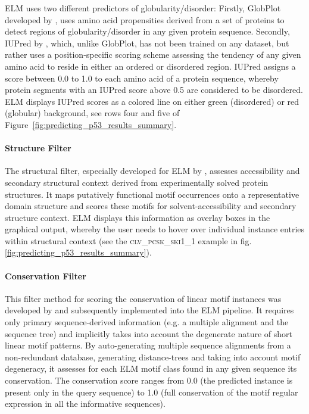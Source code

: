 \documentclass[12pt]{article}
\newcommand\motif[1]{%
    \textsc{\lowercase{#1}}%
}
\begin{document}
ELM uses two different predictors of globularity/disorder: Firstly, GlobPlot
developed by \cite{12824398}, uses amino acid propensities derived from a set of
proteins to detect regions of globularity/disorder in any given protein
sequence. Secondly, IUPred by \cite{15955779}, which, unlike GlobPlot, has not
been trained on any dataset, but rather uses a position-specific scoring scheme
assessing the tendency of any given amino acid to reside in either an ordered
or disordered region. IUPred assigns a score between 0.0 to 1.0 to each amino
acid of a protein sequence, whereby protein segments with an IUPred score above
0.5 are considered to be disordered. ELM displays IUPred scores as a colored
line on either green (disordered) or red (globular) background, see rows four
and five of Figure~\ref{fig:predicting_p53_results_summary}.

\paragraph*{Structure Filter}\label{StructureFilter}

The structural filter, especially developed for ELM by \cite{19852836},
assesses accessibility and secondary structural context derived from
experimentally solved protein structures. It maps putatively functional motif
occurrences onto a representative domain structure and scores these motifs for
solvent-accessibility and secondary structure context. ELM displays this
information as overlay boxes in the graphical output, whereby the user needs to
hover over individual instance entries within structural context (see the
\motif{CLV\_PCSK\_SKI1\_1} example in fig.
\ref{fig:predicting_p53_results_summary}).

\paragraph*{Conservation Filter}\label{ConservationFilter}

This filter method for scoring the conservation of linear motif instances was
developed by \cite{18460207} and subsequently implemented into the ELM
pipeline. It requires only primary sequence-derived information (e.g. a
multiple alignment and the sequence tree) and implicitly takes into account the
degenerate nature of short linear motif patterns. By auto-generating multiple
sequence alignments from a non-redundant database, generating distance-trees
and taking into account motif degeneracy, it assesses for each ELM motif class
found in any given sequence its conservation. The conservation score ranges
from 0.0 (the predicted instance is present only in the query sequence) to 1.0
(full conservation of the motif regular expression in all the informative
sequences).
\end{document}
